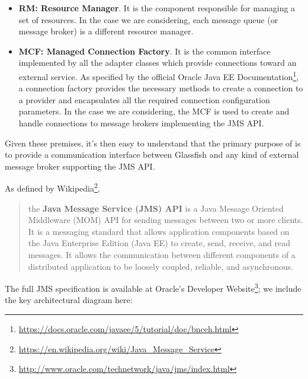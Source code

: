\begin{itemize}
	\item \textbf{RM: Resource Manager}. It is the component responsible for managing a set of resources. In the case we are considering, each message queue (or message broker) is a different resource manager. 
	\item \textbf{MCF: Managed Connection Factory}. It is the common interface implemented by all the adapter classes which provide connections toward an external service. As specified by the official Oracle Java EE Documentation\footnote{\url{https://docs.oracle.com/javaee/5/tutorial/doc/bnceh.html}}, a connection factory provides the necessary methods to create a connection to a provider and encapsulates all the required connection configuration parameters. In the case we are considering, the MCF is used to create and handle connections to message brokers implementing the JMS API.
\end{itemize}

Given these premises, it's then easy to understand that the primary purpose of  is to provide a communication interface between Glassfish and any kind of external message broker supporting the JMS API.  

As defined by Wikipedia\footnote{\url{https://en.wikipedia.org/wiki/Java_Message_Service}},
\begin{quote}the \textbf{Java Message Service (JMS) API} is a Java Message Oriented Middleware (MOM) API for sending messages between two or more clients. It is a messaging standard that allows application components based on the Java Enterprise Edition (Java EE) to create, send, receive, and read messages. It allows the communication between different components of a distributed application to be loosely coupled, reliable, and asynchronous.
\end{quote}

The full JMS specification is available at Oracle's Developer Website\footnote{\url{http://www.oracle.com/technetwork/java/jms/index.html}}; we include the key architectural diagram here: 
\begin{figure}[H]
\centering
{}
\end{figure}

